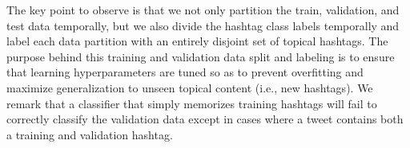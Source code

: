The key point to observe is that we not only partition the train, validation, and test data 
temporally, but we also divide the hashtag class labels temporally and label each data partition with
an entirely disjoint set of topical hashtags.
The purpose behind this training and validation data split
and labeling is to ensure that learning hyperparameters are tuned so as
to prevent overfitting and maximize generalization to unseen topical
content (i.e., new hashtags).
We remark that a classifier that simply
memorizes training hashtags will fail to correctly classify the validation data except in 
cases where a tweet contains both a training and validation hashtag.  


